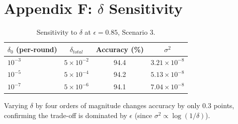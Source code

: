 \documentclass[11pt]{article}
\theoremstyle{plain}
\theoremstyle{definition}
\theoremstyle{remark}
\begin{document}
\section*{Appendix F: $\delta$ Sensitivity}
\begin{table}[!h]
\renewcommand{\arraystretch}{1.2}
\caption{Sensitivity to $\delta$ at $\epsilon = 0.85$, Scenario 3.}
\centering
\begin{tabular}{lccc}
\hline
$\delta_0$ (per-round) & $\delta_{total}$ & \textbf{Accuracy (\%)} & $\sigma^2$ \\
\hline
$10^{-3}$ & $5 \times 10^{-2}$ & 94.4 & $3.21 \times 10^{-8}$ \\
$10^{-5}$ & $5 \times 10^{-4}$ & 94.2 & $5.13 \times 10^{-8}$ \\
$10^{-7}$ & $5 \times 10^{-6}$ & 94.1 & $7.04 \times 10^{-8}$ \\
\hline
\end{tabular}
\end{table}
Varying $\delta$ by four orders of magnitude changes accuracy by only 0.3 points, confirming the trade-off is dominated by $\epsilon$ (since $\sigma^2 \propto \log(1/\delta)$).
\end{document}
